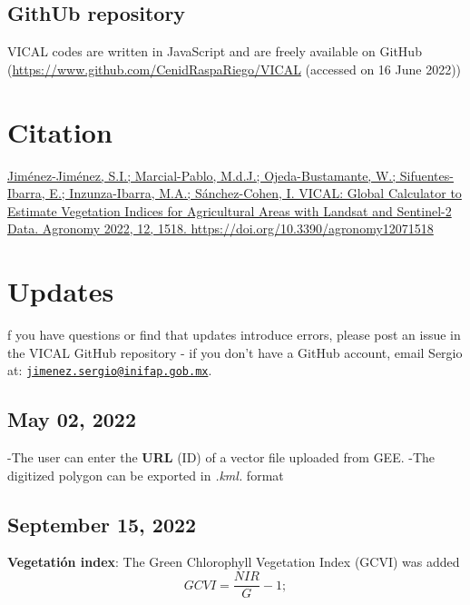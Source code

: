 \documentclass[
]{book}
\begin{document}
\hypertarget{github-repository}{%
\section{GithUb repository}\label{github-repository}}

VICAL codes are written in JavaScript and are freely available on GitHub (\url{https://www.github.com/CenidRaspaRiego/VICAL} (accessed on 16 June 2022))

\hypertarget{citation}{%
\chapter{Citation}\label{citation}}

\href{https://www.mdpi.com/2073-4395/12/7/1518}{Jiménez-Jiménez, S.I.; Marcial-Pablo, M.d.J.; Ojeda-Bustamante, W.; Sifuentes-Ibarra, E.; Inzunza-Ibarra, M.A.; Sánchez-Cohen, I. VICAL: Global Calculator to Estimate Vegetation Indices for Agricultural Areas with Landsat and Sentinel-2 Data. Agronomy 2022, 12, 1518. https://doi.org/10.3390/agronomy12071518}

\hypertarget{updates}{%
\chapter{Updates}\label{updates}}

f you have questions or find that updates introduce errors, please post an issue in the VICAL GitHub repository - if you don't have a GitHub account, email Sergio at: \href{mailto:jimenez.sergio@inifap.gob.mx}{\nolinkurl{jimenez.sergio@inifap.gob.mx}}.

\hypertarget{may-02-2022}{%
\section{May 02, 2022}\label{may-02-2022}}

-The user can enter the \textbf{URL} (ID) of a vector file uploaded from GEE.
-The digitized polygon can be exported in \emph{.kml.} format

\hypertarget{september-15-2022}{%
\section{September 15, 2022}\label{september-15-2022}}

\textbf{Vegetatión index}: The Green Chlorophyll Vegetation Index (GCVI) was added
\[
GCVI = \frac{NIR}{G}-1;     
\]
\end{document}
